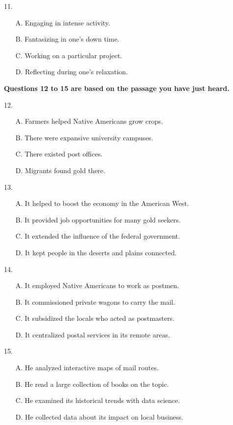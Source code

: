 \documentclass[UTF8,11pt]{ctexart}
\begin{document}
11.


\begin{itemize}[leftmargin=2em,itemsep=.2em,topsep=.4em]\item[A.] Engaging in intense activity.
\item[B.] Fantasizing in one’s down time.
\item[C.] Working on a particular project.
\item[D.] Reflecting during one’s relaxation.
\end{itemize}

\textbf{Questions 12 to 15 are based on the passage you have just heard.}


12.


\begin{itemize}[leftmargin=2em,itemsep=.2em,topsep=.4em]\item[A.] Farmers helped Native Americans grow crops.
\item[B.] There were expansive university campuses.
\item[C.] There existed post offices.
\item[D.] Migrants found gold there.
\end{itemize}

13.


\begin{itemize}[leftmargin=2em,itemsep=.2em,topsep=.4em]\item[A.] It helped to boost the economy in the American West.
\item[B.] It provided job opportunities for many gold seekers.
\item[C.] It extended the influence of the federal government.
\item[D.] It kept people in the deserts and plains connected.
\end{itemize}

14.


\begin{itemize}[leftmargin=2em,itemsep=.2em,topsep=.4em]\item[A.] It employed Native Americans to work as postmen.
\item[B.] It commissioned private wagons to carry the mail.
\item[C.] It subsidized the locals who acted as postmasters.
\item[D.] It centralized postal services in its remote areas.
\end{itemize}

15.


\begin{itemize}[leftmargin=2em,itemsep=.2em,topsep=.4em]\item[A.] He analyzed interactive maps of mail routes.
\item[B.] He read a large collection of books on the topic.
\item[C.] He examined its historical trends with data science.
\item[D.] He collected data about its impact on local business.
\end{itemize}
\end{document}

